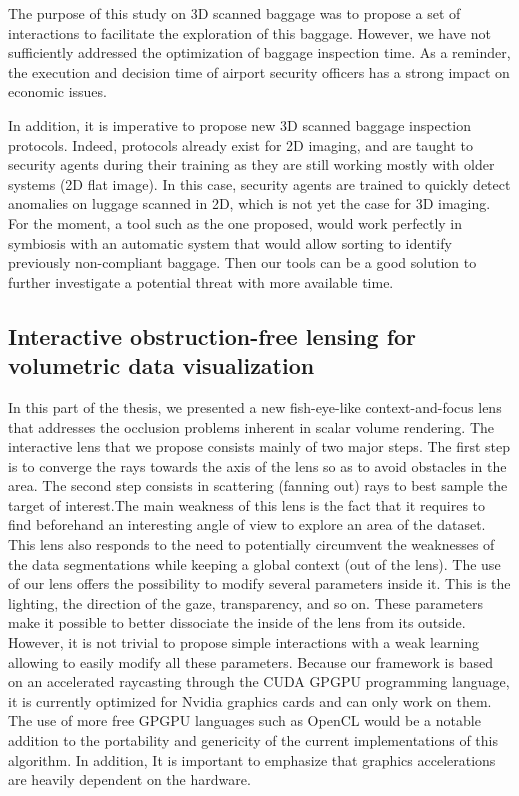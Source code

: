 \par The purpose of this study on 3D scanned baggage was to propose a set of interactions to facilitate the exploration of this baggage. However, we have not sufficiently addressed the optimization of baggage inspection time. As a reminder, the execution and decision time of airport security officers has a strong impact on economic issues.

In addition, it is imperative to propose new 3D scanned baggage inspection protocols. Indeed, protocols already exist for 2D imaging, and are taught to security agents during their training as they are still working mostly with older systems (2D flat image). In this case, security agents are trained to quickly detect anomalies on luggage scanned in 2D, which is not yet the case for 3D imaging. For the moment, a tool such as the one proposed, would work perfectly in symbiosis with an automatic system that would allow sorting to identify previously non-compliant baggage. Then our tools can be a good solution to further investigate a potential threat with more available time.



\subsection{Interactive obstruction-free lensing for volumetric data visualization }
In this part of the thesis, we presented a new fish-eye-like context-and-focus lens that addresses the occlusion problems inherent in scalar volume rendering. The interactive lens that we propose consists mainly of two major steps. The first step is to converge the rays towards the axis of the lens so as to avoid obstacles in the area. The second step consists in scattering (fanning out) rays to best sample the target of interest.The main weakness of this lens is the fact that it requires to find beforehand an interesting angle of view to explore an area of the dataset. This lens also responds to the need to potentially circumvent the weaknesses of the data segmentations while keeping a global context (out of the lens). The use of our lens offers the possibility to modify several parameters inside it. This is the lighting, the direction of the gaze, transparency, and so on. These parameters make it possible to better dissociate the inside of the lens from its outside. However, it is not trivial to propose simple interactions with a weak learning allowing to easily modify all these parameters. Because our framework is based on an accelerated raycasting through the CUDA GPGPU programming language, it is currently optimized for Nvidia graphics cards and can only work on them. The use of more free GPGPU languages such as OpenCL would be a notable addition to the portability and genericity of the current implementations of this algorithm. In addition, It is important to emphasize that graphics accelerations are heavily dependent on the hardware.


